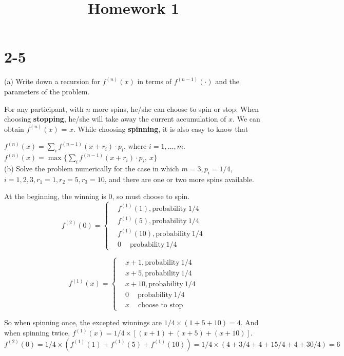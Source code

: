 \documentclass[UTF8]{article}
\title {Homework 1}
\date{}
\begin{document}
    \maketitle
\section*{2-5}

    (a) Write down a recursion for $f^{(n)} (x)$ in terms of $f^{(n-1)} (\cdot)$ and the parameters of the problem.
    \large

    For any participant, with $n$ more spins, he/she can choose to spin or stop. When choosing \textbf{stopping}, he/she will take away the  current accumulation of $x$. We can obtain $f^{(n)} (x)$ = $x$. While choosing \textbf{spinning}, it is also easy to know that

    $ f^{(n)}(x)= \sum_{i} f^{(n-1)}(x+r_i)\cdot p_i$, where $i = 1,\ldots,m.$\\

    $ f^{(n)}(x)= \max\{\sum_{i} f^{(n-1)}(x+r_i)\cdot p_i, ~x\}$
    \normalsize
    ~\\

    (b) Solve the problem numerically for the case in which $m=3, p_i = 1/4$,  $i = 1,2,3, r_1 =1, r_2 =5, r_3 =10$, and there are one or two more spins available.

    \large
    At the beginning, the winning is $0$, so must choose to spin.
    $$ f^{(2)}(0)=\left\{
    \begin{aligned}
    & f^{(1)}(1), \text{probability} ~1/4 \\
    & f^{(1)}(5), \text{probability} ~1/4 \\
    & f^{(1)}(10), \text{probability} ~1/4 \\
    & 0 ~\quad \text{probability} ~1/4
    \end{aligned}
    \right.
    $$

    $$ f^{(1)}(x)=\left\{
    \begin{aligned}
    & x+1, \text{probability} ~1/4 \\
    & x+5, \text{probability} ~1/4 \\
    & x+10, \text{probability} ~1/4 \\
    & 0 ~\quad \text{probability} ~1/4 \\
    & x ~\quad \text{choose to stop}
    \end{aligned}
    \right.
    $$

So when spinning once, the excepted winnings are $1/4 \times (1+5+10)=4$. And when spinning twice, $f^{(1)}(x) = 1/4 \times [(x+1)+(x+5)+(x+10)]$. $f^{(2)}(0) =1/4 \times (f^{(1)}(1)+f^{(1)}(5)+f^{(1)}(10))= 1/4 \times (4+3/4+4+15/4+4+30/4) = 6$
\end{document}
